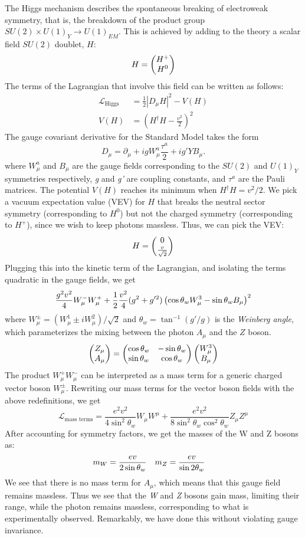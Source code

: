 The Higgs mechanism describes the spontaneous breaking of electroweak symmetry, that is, the breakdown of the product group $SU(2)\times U(1)_Y\rightarrow U(1)_{EM}$. This is achieved by adding to the theory a scalar field $SU(2)$ doublet, $H$:
$$H = \begin{pmatrix} H^+ \\ H^0\end{pmatrix}$$
The terms of the Lagrangian that involve this field can be written as follows:
\begin{align}
  \label{eq:higgs_kinetic}
  \mathcal{L}_{\text{Higgs}} &= \frac{1}{2}\left|D_\mu H\right|^2-V(H)\\
  \label{eq:higgs_potential}
  V(H) &= \left(H^\dag H-\frac{v^2}{2}\right)^2
\end{align}
The gauge covariant derivative for the Standard Model takes the form
$$D_\mu = \partial_\mu + igW_\mu^a\frac{\tau^a}{2}+ig'YB_\mu.$$
where $W_\mu^a$ and $B_\mu$ are the gauge fields corresponding to the $SU(2)$ and $U(1)_Y$ symmetries respectively, \emph{g} and \emph{g'} are coupling constants, and $\tau^a$ are the Pauli matrices. The potential $V(H)$ reaches its minimum when $H^\dag H = v^2 / 2$. We pick a vacuum expectation value (VEV) for $H$ that breaks the neutral sector symmetry (corresponding to $H^0$) but not the charged symmetry (corresponding to $H^{+}$), since we wish to keep photons massless. Thus, we can pick the VEV:
$$H = \begin{pmatrix} 0 \\ \frac{v}{\sqrt{2}}\end{pmatrix}$$
Plugging this into the kinetic term of the Lagrangian, and isolating the terms quadratic in the gauge fields, we get
\[\frac{g^2v^2}{4}W_\mu^-W_\mu^++\frac{1}{2}\frac{v^2}{4}(g^2+g'^2)
\left(\cos\theta_w W_\mu^3 - \sin\theta_w B_\mu\right)^2\]
where $W_\mu^\pm = (W_\mu^1\pm iW_\mu^2)/\sqrt{2}$  and $\theta_w = \tan^{-1}(g'/g)$ is the \emph{Weinberg angle}, which parameterizes the mixing between the photon $A_\mu$ and the $Z$ boson.
\begin{equation}\label{eq:z_a_mixing}
\begin{pmatrix} Z_\mu \\ A_\mu\end{pmatrix} = \begin{pmatrix} \cos\theta_w & -\sin\theta_w \\ \sin\theta_w & \cos\theta_w\end{pmatrix}
\begin{pmatrix} W_{\mu}^{3} \\ B_{\mu}\end{pmatrix}
\end{equation}
The product $W_\mu^+W_\mu^-$ can be interpreted as a mass term for a generic charged vector boson $W_\mu^\pm$. Rewriting our mass terms for the vector boson fields with the above redefinitions, we get
\[\mathcal{L}_{\text{mass terms}}=\frac{e^2v^2}{4\sin^2\theta_w}W_\mu W^\mu+
\frac{e^2v^2}{8\sin^2\theta_w\cos^2\theta_w}Z_\mu Z^\mu\]
After accounting for symmetry factors, we get the masses of the W and Z bosons as:
\begin{align*}
  m_W &=\frac{ev}{2\sin\theta_w} & 
  m_Z &=\frac{ev}{\sin2\theta_w}
\end{align*}
We see that there is no mass term for $A_\mu$, which means that this gauge field remains massless. Thus we see that the \emph{W} and \emph{Z} bosons gain mass, limiting their range, while the photon remains massless, corresponding to what is experimentally observed. Remarkably, we have done this without violating gauge invariance. 

